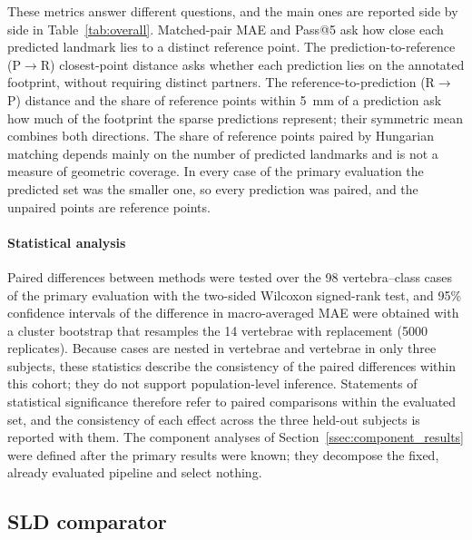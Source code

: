 \documentclass[5p,times,twocolumn,authoryear]{elsarticle}
\newif\ifhighlight
\newcommand{\rev}[1]{\ifhighlight{\color{revcolor}#1}\else#1\fi}
\newcommand{\revstart}{\ifhighlight\begingroup\color{revcolor}\fi}
\newcommand{\revend}{\ifhighlight\par\endgroup\fi}
\begin{document}
\revstart
These metrics answer different questions, and the main ones are reported side by side in Table~\ref{tab:overall}. Matched-pair MAE and Pass@5 ask how close each predicted landmark lies to a distinct reference point. The prediction-to-reference (P$\rightarrow$R) closest-point distance asks whether each prediction lies on the annotated footprint, without requiring distinct partners. The reference-to-prediction (R$\rightarrow$P) distance and the share of reference points within 5~mm of a prediction ask how much of the footprint the sparse predictions represent; their symmetric mean combines both directions. The share of reference points paired by Hungarian matching depends mainly on the number of predicted landmarks and is not a measure of geometric coverage. In every case of the primary evaluation the predicted set was the smaller one, so every prediction was paired, and the unpaired points are reference points.
\revend

\paragraph{Statistical analysis} Paired differences between methods were tested over the 98 vertebra--class cases of the primary evaluation with the two-sided Wilcoxon signed-rank test, and 95\% confidence intervals of the difference in macro-averaged MAE were obtained with a cluster bootstrap that resamples the 14 vertebrae with replacement (5000 replicates). Because cases are nested in vertebrae and vertebrae in only three subjects, these statistics describe the consistency of the paired differences within this cohort; they do not support population-level inference. \rev{Statements of statistical significance therefore refer to paired comparisons within the evaluated set, and the consistency of each effect across the three held-out subjects is reported with them.} \rev{The component analyses of Section~\ref{ssec:component_results} were defined after the primary results were known; they decompose the fixed, already evaluated pipeline and select nothing.}

\subsection{SLD comparator}
\label{ssec:sld_evaluation}
\end{document}
